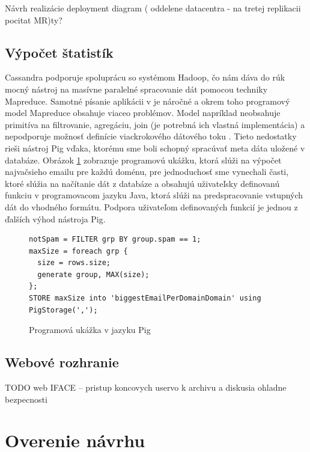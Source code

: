 \documentclass[11pt,twoside,a4paper]{book}
\begin{document}
Návrh realizácie
deployment diagram ( oddelene datacentra - na tretej replikacii pocitat MR)ty?

\subsection{Výpočet štatistík}


Cassandra podporuje spoluprácu so systémom Hadoop, čo nám dáva do rúk mocný nástroj na masívne paralelné spracovanie dát pomocou techniky Mapreduce. Samotné písanie aplikácii v je náročné a okrem toho programový model Mapreduce obsahuje viaceo problémov. Model napríklad neobsahuje primitíva na filtrovanie, agregáciu, join (je potrebná ich vlastná implementácia) a nepodporuje možnosť definície viackrokového dátového toku \cite{Gates:2009:BHD:1687553.1687568}. Tieto nedostatky rieši nástroj Pig vďaka, ktorému sme boli schopný spracúvať meta dáta uložené v databáze. Obrázok \ref{fig:PigExample} zobrazuje programovú ukážku, ktorá slúži na výpočet najvačsieho emailu pre každú doménu, pre jednoduchosť sme vynechali časti, ktoré slúžia na načítanie dát z databáze a obsahujú uživateľsky definovanú funkciu v programovacom jazyku Java, ktorá slúži na predspracovanie vstupných dát do vhodného formátu. Podpora uživateľom definovaných funkcií je jednou z ďalších výhod nástroja Pig.

\begin{figure}[h]
\begin{verbatim}
notSpam = FILTER grp BY group.spam == 1;
maxSize = foreach grp {
  size = rows.size;
  generate group, MAX(size);
};
STORE maxSize into 'biggestEmailPerDomainDomain' using PigStorage(',');
\end{verbatim}
 \caption{Programová ukážka v jazyku Pig}
 \label{fig:PigExample}
\end{figure}  



\subsection{Webové rozhranie}
TODO
web IFACE -- pristup koncovych uservo k archivu a diskusia ohladne bezpecnosti



\section{Overenie návrhu}
\end{document}
